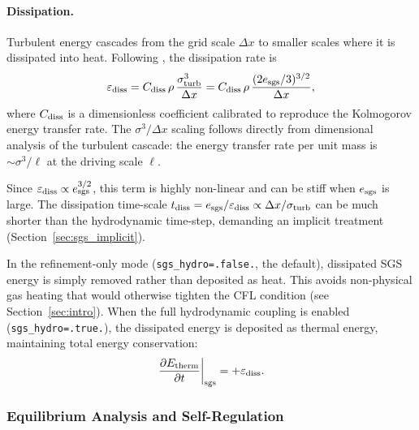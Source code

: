 \documentclass[fleqn,usenatbib]{mnras}
\newcommand{\dx}{\Delta x}
\newcommand{\code}[1]{\texttt{#1}}
\begin{document}
\paragraph{Dissipation.}
Turbulent energy cascades from the grid scale $\dx$ to smaller scales
where it is dissipated into heat.  Following
\citet{Schmidt2006,Semenov2016}, the dissipation rate is
\begin{equation}
  \varepsilon_{\rm diss}
    = C_{\rm diss}\,\rho\,
      \frac{\sigma_{\rm turb}^3}{\dx}
    = C_{\rm diss}\,\rho\,
      \frac{(2e_{\rm sgs}/3)^{3/2}}{\dx},
  \label{eq:sgs_diss}
\end{equation}
where $C_{\rm diss}$ is a dimensionless coefficient calibrated to
reproduce the Kolmogorov energy transfer rate.  The $\sigma^3/\dx$
scaling follows directly from dimensional analysis of the turbulent
cascade: the energy transfer rate per unit mass is
$\sim\sigma^3/\ell$ at the driving scale $\ell$.

Since $\varepsilon_{\rm diss} \propto e_{\rm sgs}^{3/2}$, this term
is highly non-linear and can be stiff when $e_{\rm sgs}$ is large.
The dissipation time-scale
$t_{\rm diss} = e_{\rm sgs}/\varepsilon_{\rm diss}
  \propto \dx/\sigma_{\rm turb}$
can be much shorter than the hydrodynamic time-step, demanding an
implicit treatment (Section~\ref{sec:sgs_implicit}).

In the refinement-only mode (\code{sgs\_hydro=.false.}, the default),
dissipated SGS energy is simply removed rather than deposited as heat.
This avoids non-physical gas heating that would otherwise tighten
the CFL condition (see Section~\ref{sec:intro}).  When the full
hydrodynamic coupling is enabled (\code{sgs\_hydro=.true.}), the
dissipated energy is deposited as thermal energy, maintaining total
energy conservation:
\begin{equation}
  \left.\frac{\partial E_{\rm therm}}{\partial t}\right|_{\rm sgs}
  = +\varepsilon_{\rm diss}.
  \label{eq:sgs_heating}
\end{equation}


\subsubsection{Equilibrium Analysis and Self-Regulation}
\label{sec:sgs_equilib}
\end{document}
